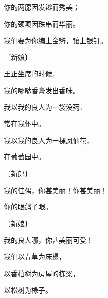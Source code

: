 {\par }{\Q {}你的两腮因发辫而秀美；
\par }{\Q 你的颈项因珠串而华丽。
\par }{\Q {}我们要为你编上金辫，镶上银钉。
\par }{\SP 〔新娘〕
\par }{\Q {}王正坐席的时候，
\par }{\Q 我的哪哒香膏发出香味。
\par }{\Q {}我以我的良人为一袋没药，
\par }{\Q 常在我怀中。
\par }{\Q {}我以我的良人为一棵凤仙花，
\par }{\Q 在{}葡萄园中。
\par }{\SP 〔新郎〕
\par }{\Q {}我的佳偶，你甚美丽！你甚美丽！
\par }{\Q 你的眼{}鸽子眼。
\par }{\SP 〔新娘〕
\par }{\Q {}我的良人哪，你甚美丽可爱！
\par }{\Q 我们以青草为床榻，
\par }{\Q {}以香柏树为房屋的栋梁，
\par }{\Q 以松树为椽子。

}
